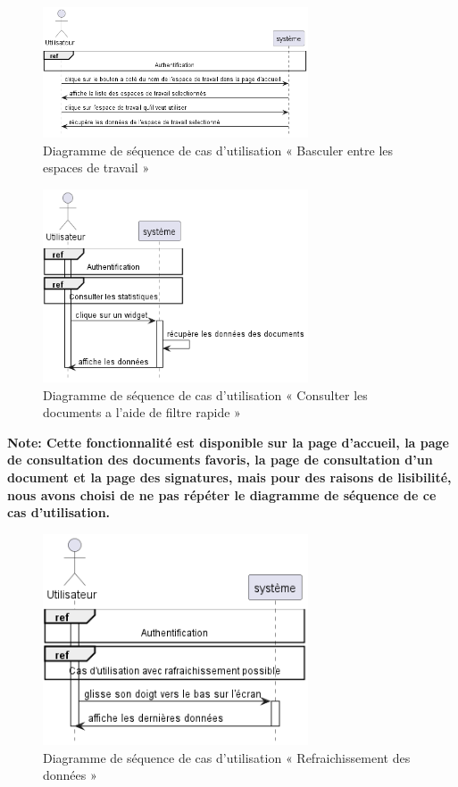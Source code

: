 \begin{figure}[H]
  \centering
  \includegraphics[width=0.7\textwidth]{out/diagrams/sprint7/switch_workspace/switch_workspace}
  \caption{Diagramme de séquence de cas d'utilisation « Basculer entre les espaces de travail »}
  \label{fig:sequence_switch_workspace}
\end{figure}

\begin{figure}[H]
  \centering
  \includegraphics[width=0.7\textwidth]{out/diagrams/sprint7/docs_quick_filter/docs_quick_filter}
  \caption{Diagramme de séquence de cas d'utilisation « Consulter les documents a l'aide de filtre rapide »}
  \label{fig:sequence_docs_quick_filter}
\end{figure}

\textbf{Note: Cette fonctionnalité est disponible sur la page d'accueil, la page de consultation des documents favoris, la page de consultation d'un document et la page des signatures, mais pour des raisons de lisibilité, nous avons choisi de ne pas répéter le diagramme de séquence de ce cas d'utilisation.}
\begin{figure}[H]
  \centering
  \includegraphics[width=0.7\textwidth]{out/diagrams/sprint7/refresh_data/refresh_data}
  \caption{Diagramme de séquence de cas d'utilisation « Refraichissement des données »}
  \label{fig:sequence_refresh_data}
\end{figure}


